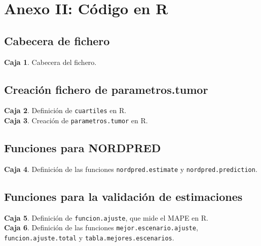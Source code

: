 \section*{Anexo II: Código en R}\label{anexo2}

\subsection*{Cabecera de fichero}

\noindent \textbf{Caja 1}. Cabecera del fichero.\\ 



\subsection*{Creación fichero de parametros.tumor}

\noindent \textbf{Caja 2}. Definición de \texttt{cuartiles} en R.\\



\noindent \textbf{Caja 3}. Creación de \texttt{parametros.tumor} en R.\\



\subsection*{Funciones para NORDPRED}
\noindent \textbf{Caja 4}. Definición de las funciones \texttt{nordpred.estimate} y \texttt{nordpred.prediction}.\\



\subsection*{Funciones para la validación de estimaciones}

\noindent \textbf{Caja 5}. Definición de \texttt{funcion.ajuste}, que mide el MAPE en R.\\



\noindent \textbf{Caja 6}. Definición de las funciones \texttt{mejor.escenario.ajuste}, \texttt{funcion.ajuste.total} y  \texttt{tabla.mejores.escenarios}.\\



